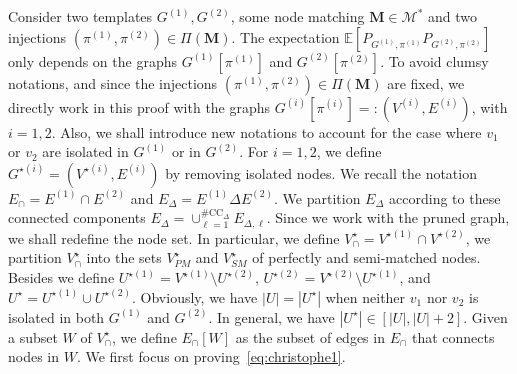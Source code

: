 \documentclass[final]{colt2026}
\newcommand{\1}{\mathbf{1}}
\newcommand{\bbE}{\mathbb{E}}
\newcommand{\cro}[1]{\left[#1\right]}
\begin{document}
Consider two templates $G^{(1)}, G^{(2)}$, some node matching $\mathbf M \in \mathcal M^*$ and two injections $(\pi^{(1)}, \pi^{(2)})\in \Pi(\mathbf{M})$. 
The expectation $ \bbE\cro{P_{G^{(1)}, \pi^{(1)}}P_{G^{(2)}, \pi^{(2)}}}$ only depends on the graphs $G^{(1)}\cro{\pi^{(1)}}$ and $G^{(2)}\cro{\pi^{(2)}}$. 
To avoid clumsy notations, and since the injections $(\pi^{(1)}, \pi^{(2)})\in \Pi(\mathbf{M})$ are fixed, we directly work in this proof with the graphs $G^{(i)}\cro{\pi^{(i)}}=:(V^{(i)},E^{(i)})$, with $i=1,2$. Also, we shall introduce new notations to account for the case where $v_1$ or $v_2$ are isolated in $G^{(1)}$ or in $G^{(2)}$.
For $i=1,2$, we define $G^{\star(i)}=(V^{\star(i)},E^{(i)})$  by removing isolated nodes. 
We recall the notation  $E_{\cap}= E^{(1)}\cap E^{(2)}$ and $E_{\Delta}= E^{(1)}\Delta E^{(2)}$. We partition $E_{\Delta}$ according to these connected components $E_{\Delta}=\cup_{\ell=1}^{\#\mathrm{CC}_{\Delta}} E_{\Delta,\ell}$. Since we work with the pruned graph, we shall redefine the node set. In particular, we define $V^{\star}_{\cap}= V^{\star(1)}\cap  V^{\star(2)}$, we partition $V^{\star}_{\cap}$ into the sets $V^{\star}_{PM}$ and $V^{\star}_{SM}$ of perfectly and semi-matched nodes. Besides we define $U^{\star(1)}= V^{\star(1)}\setminus U^{\star(2)}$, $U^{\star(2)}= V^{\star(2)}\setminus U^{\star(1)}$, and $U^{\star}= U^{\star(1)}\cup U^{\star(2)}$. Obviously, we have $|U|=|U^{\star}|$ when neither $v_1$ nor $v_2$ is isolated in both $G^{(1)}$ and $G^{(2)}$. In general, we have $|U^{\star}|\in [|U|, |U|+2]$.
 Given a subset $W$ of $V^{\star}_{\cap}$, we define $E_{\cap}[W]$ as the subset of edges in $E_{\cap}$ that connects nodes in $W$. We first focus on proving~\eqref{eq:christophe1}.
\end{document}
